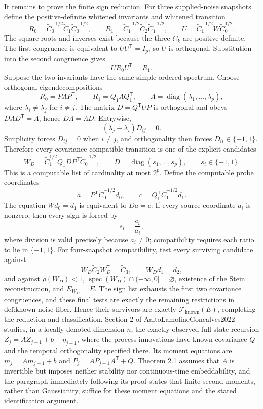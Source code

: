 It remains to prove the finite sign reduction.  For three supplied-noise snapshots define the positive-definite whitened invariants and whitened transition
\[
 R_0=\widetilde C_0^{-1/2}\widetilde C_1\widetilde C_0^{-1/2},
 \qquad
 R_1=\widetilde C_1^{-1/2}\widetilde C_2\widetilde C_1^{-1/2},
 \qquad
 U=\widetilde C_1^{-1/2}W\widetilde C_0^{1/2}.
\]
The square roots and inverses exist because the three \(\widetilde C_k\) are positive definite.  The first congruence is equivalent to \(UU^{\mathsf T}=I_p\), so \(U\) is orthogonal.  Substitution into the second congruence gives
\[
 UR_0U^{\mathsf T}=R_1.
\]
Suppose the two invariants have the same simple ordered spectrum.  Choose orthogonal eigendecompositions
\[
 R_0=P\Lambda P^{\mathsf T},
 \qquad
 R_1=Q_1\Lambda Q_1^{\mathsf T},
 \qquad
 \Lambda=\operatorname{diag}(\lambda_1,\ldots,\lambda_p),
\]
where \(\lambda_i\ne\lambda_j\) for \(i\ne j\).  The matrix \(D=Q_1^{\mathsf T}UP\) is orthogonal and obeys \(D\Lambda D^{\mathsf T}=\Lambda\), hence \(D\Lambda=\Lambda D\).  Entrywise,
\[
 (\lambda_j-\lambda_i)D_{ij}=0.
\]
Simplicity forces \(D_{ij}=0\) when \(i\ne j\), and orthogonality then forces \(D_{ii}\in\{-1,1\}\).  Therefore every covariance-compatible transition is one of the explicit candidates
\[
 W_D=\widetilde C_1^{1/2}Q_1DP^{\mathsf T}\widetilde C_0^{-1/2},
 \qquad
 D=\operatorname{diag}(s_1,\ldots,s_p),
 \qquad
 s_i\in\{-1,1\}.
\]
This is a computable list of cardinality at most \(2^p\).  Define the computable probe coordinates
\[
 a=P^{\mathsf T}\widetilde C_0^{-1/2}d_0,
 \qquad
 c=Q_1^{\mathsf T}\widetilde C_1^{-1/2}d_1.
\]
The equation \(Wd_0=d_1\) is equivalent to \(Da=c\).  If every source coordinate \(a_i\) is nonzero, then every sign is forced by
\[
 s_i=\frac{c_i}{a_i},
\]
where division is valid precisely because \(a_i\ne0\); compatibility requires each ratio to lie in \(\{-1,1\}\).  For four-snapshot compatibility, test every surviving candidate against
\[
 W_D\widetilde C_2W_D^{\mathsf T}=\widetilde C_3,
 \qquad
 W_Dd_1=d_2,
\]
and against \(\rho(W_D)<1\), \(\operatorname{spec}(W_D)\cap(-\infty,0]=\varnothing\), existence of the Stein reconstruction, and \(E_{W_D}=E\).  The sign list exhausts the first two covariance congruences, and these final tests are exactly the remaining restrictions in \(\text{def:known-noise-fiber}\).  Hence their survivors are exactly \(\mathcal F_{\mathrm{known}}(E)\), completing the reduction and classification.
Section 2 of AaltoLamolineGoncalves2022 studies, in a locally denoted dimension \(n\), the exactly observed full-state recursion \(Z_j=A Z_{j-1}+b+\eta_{j-1}\), where the process innovations have known covariance \(Q\) and the temporal orthogonality specified there.  Its moment equations are \(\bar m_j=A\bar m_{j-1}+b\) and \(P_j=AP_{j-1}A^{\mathsf T}+Q\).  Theorem 2.1 assumes that \(A\) is invertible but imposes neither stability nor continuous-time embeddability, and the paragraph immediately following its proof states that finite second moments, rather than Gaussianity, suffice for these moment equations and the stated identification argument.
